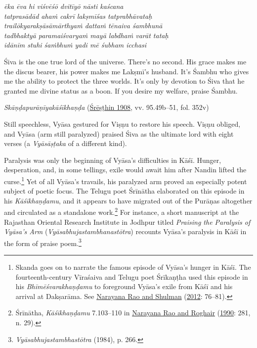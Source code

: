 \begin{pullquote}\raggedright
      \emph{ēka ēva hi viśvēśō dvitīyō nāsti kaścana}\\
\emph{tatprasādād ahaṁ cakrī lakṣmīśas tatprabhāvataḥ}\\
\emph{trailōkyarakṣāsāmārthyaṁ dattaṁ tēnaiva śambhunā}\\
\emph{tadbhaktyā paramaiśvaryaṁ mayā labdhaṁ varāt tataḥ}\\
\emph{idānīm stuhi śaṁbhuṁ yadi mē śubham icchasi}
\end{pullquote}
      
\begin{pullquote}
Śiva is the one true lord of the universe. There’s no second. His grace makes me the discus bearer, his power makes me Lakṣmī’s husband. It’s Śambhu who gives me the ability to protect the three worlds. It’s only by devotion to Śiva that he granted me divine status as a boon. If you desire my welfare, praise Śambhu.


\medskip\hfill\begin{minipage}{0.9\textwidth}\small\hfill
\emph{{Skāṇḍapurāṇīyakāśīkhaṇḍa}} (\hyperref[Kasikhanda1908]{Śrēṣṭhin 1908}, vv. 95.49b–51, fol. 352v)\end{minipage}\hspace{2em}
\end{pullquote}

Still speechless, Vyāsa gestured for Viṣṇu to restore his speech. Viṣṇu obliged, and Vyāsa (arm still paralyzed) praised Śiva as the ultimate lord with eight verses (a \emph{{Vyāsāṣṭaka}} of a different kind).


Paralysis was only the beginning of Vyāsa’s difficulties in Kāśī. Hunger, desperation, and, in some tellings, exile would await him after Nandin lifted the curse.\footnote{%
Skanda goes on to narrate the famous episode of Vyāsa’s hunger in Kāśī. The fourteenth-century Vīraśaiva and Telugu poet Śrīkaṇṭha used this episode in his \emph{{Bhīmēśvarakhaṇḍamu}} to foreground Vyāsa’s exile from Kāśī and his arrival at Dakṣarāma. See \hyperref[Rao2012]{Narayana Rao and Shulman} (\hyperref[Rao2012]{2012}: 76–81).
}
 Yet of all Vyāsa’s travails, his paralyzed arm proved an especially potent subject of poetic focus. The Telugu poet Śrīnātha elaborated on this episode in his \emph{{Kāśīkhaṇḍamu}}, and it appears to have migrated out of the Purāṇas altogether and circulated as a standalone work.\footnote{%
Śrīnātha, \emph{{Kāśīkhaṇḍamu}} 7.103–110 in \hyperref[Rao1990]{Narayana Rao and Roghair} (\hyperref[Rao1990]{1990}: 281, n. 29).
}
 For instance, a short manuscript at the Rajasthan Oriental Research Institute in Jodhpur titled \emph{Praising the Paralysis of Vyāsa’s Arm} (\emph{{Vyāsabhujastambhanastōtra}}) recounts Vyāsa’s paralysis in Kāśī in the form of praise poem.\footnote{%
\emph{{Vyāsabhujastambhastōtra}} (1984), p. 266.
}


